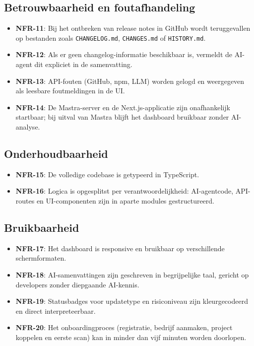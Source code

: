 \subsection{Betrouwbaarheid en foutafhandeling}
\label{sec:nfr-betrouwbaarheid}

\begin{itemize}
  \item \textbf{NFR-11}: Bij het ontbreken van release notes in GitHub wordt teruggevallen op bestanden zoals \texttt{CHANGELOG.md}, \texttt{CHANGES.md} of \texttt{HISTORY.md}.
  \item \textbf{NFR-12}: Als er geen changelog-informatie beschikbaar is, vermeldt de AI-agent dit expliciet in de samenvatting.
  \item \textbf{NFR-13}: API-fouten (GitHub, npm, LLM) worden gelogd en weergegeven als leesbare foutmeldingen in de UI.
  \item \textbf{NFR-14}: De Mastra-server en de Next.js-applicatie zijn onafhankelijk startbaar; bij uitval van Mastra blijft het dashboard bruikbaar zonder AI-analyse.
\end{itemize}


\subsection{Onderhoudbaarheid}
\label{sec:nfr-onderhoudbaarheid}

\begin{itemize}
  \item \textbf{NFR-15}: De volledige codebase is getypeerd in TypeScript.
  \item \textbf{NFR-16}: Logica is opgesplitst per verantwoordelijkheid: AI-agentcode, API-routes en UI-componenten zijn in aparte modules gestructureerd.
\end{itemize}


\subsection{Bruikbaarheid}
\label{sec:nfr-bruikbaarheid}

\begin{itemize}
  \item \textbf{NFR-17}: Het dashboard is responsive en bruikbaar op verschillende schermformaten.
  \item \textbf{NFR-18}: AI-samenvattingen zijn geschreven in begrijpelijke taal, gericht op developers zonder diepgaande AI-kennis.
  \item \textbf{NFR-19}: Statusbadges voor updatetype en risiconiveau zijn kleurgecodeerd en direct interpreteerbaar.
  \item \textbf{NFR-20}: Het onboardingproces (registratie, bedrijf aanmaken, project koppelen en eerste scan) kan in minder dan vijf minuten worden doorlopen.
\end{itemize}


